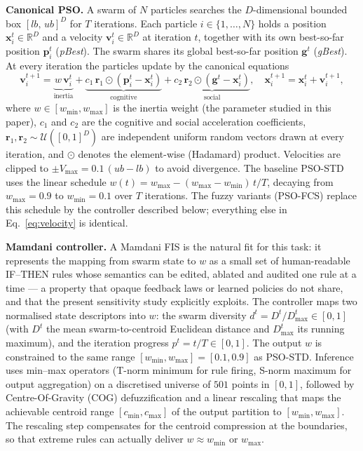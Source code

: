 \documentclass[runningheads]{llncs}
\begin{document}
\textbf{Canonical PSO.} A swarm of $N$ particles searches the $D$-dimensional bounded box $[lb,\,ub]^{D}$ for $T$ iterations. Each particle $i \in \{1,\dots,N\}$ holds a position $\mathbf{x}_i^{t}\in\mathbb{R}^{D}$ and a velocity $\mathbf{v}_i^{t}\in\mathbb{R}^{D}$ at iteration $t$, together with its own best-so-far position $\mathbf{p}_i^{t}$ (\emph{pBest}). The swarm shares its global best-so-far position $\mathbf{g}^{t}$ (\emph{gBest}). At every iteration the particles update by the canonical equations~\cite{kennedy1995,shi1998}
\begin{equation}\label{eq:velocity}
\mathbf{v}_i^{t+1} = \underbrace{w\,\mathbf{v}_i^{t}}_{\text{inertia}} + \underbrace{c_1\,\mathbf{r}_1 \odot (\mathbf{p}_i^{t}-\mathbf{x}_i^{t})}_{\text{cognitive}} + \underbrace{c_2\,\mathbf{r}_2 \odot (\mathbf{g}^{t}-\mathbf{x}_i^{t})}_{\text{social}},
\quad \mathbf{x}_i^{t+1} = \mathbf{x}_i^{t} + \mathbf{v}_i^{t+1},
\end{equation}
where $w \in [w_{\min}, w_{\max}]$ is the inertia weight (the parameter studied in this paper), $c_1$ and $c_2$ are the cognitive and social acceleration coefficients, $\mathbf{r}_1,\mathbf{r}_2 \sim \mathcal{U}([0,1]^{D})$ are independent uniform random vectors drawn at every iteration, and $\odot$ denotes the element-wise (Hadamard) product. Velocities are clipped to $\pm V_{\max} = 0.1\,(ub-lb)$ to avoid divergence. The baseline PSO-STD uses the linear schedule $w(t) = w_{\max} - (w_{\max}-w_{\min})\,t/T$, decaying from $w_{\max}=0.9$ to $w_{\min}=0.1$ over $T$ iterations. The fuzzy variants (PSO-FCS) replace this schedule by the controller described below; everything else in Eq.~\eqref{eq:velocity} is identical.

\textbf{Mamdani controller.} A Mamdani FIS is the natural fit for this task: it represents the mapping from swarm state to $w$ as a small set of human-readable IF--THEN rules whose semantics can be edited, ablated and audited one rule at a time --- a property that opaque feedback laws or learned policies do not share, and that the present sensitivity study explicitly exploits. The controller maps two normalised state descriptors into $w$: the swarm diversity $d^{t} = D^{t}/D_{\max}^{t} \in [0,1]$ (with $D^{t}$ the mean swarm-to-centroid Euclidean distance and $D_{\max}^{t}$ its running maximum), and the iteration progress $p^{t} = t/T \in [0,1]$. The output $w$ is constrained to the same range $[w_{\min},w_{\max}] = [0.1, 0.9]$ as PSO-STD. Inference uses min--max operators (T-norm minimum for rule firing, S-norm maximum for output aggregation) on a discretised universe of $501$ points in $[0,1]$, followed by Centre-Of-Gravity (COG) defuzzification and a linear rescaling that maps the achievable centroid range $[c_{\min}, c_{\max}]$ of the output partition to $[w_{\min}, w_{\max}]$. The rescaling step compensates for the centroid compression at the boundaries, so that extreme rules can actually deliver $w \approx w_{\min}$ or $w_{\max}$.
\end{document}
